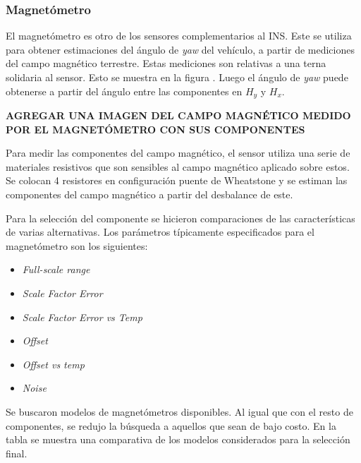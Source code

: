 \subsubsection{Magnetómetro}

El magnetómetro es otro de los sensores complementarios al INS. Este se utiliza para obtener estimaciones del ángulo de \textit{yaw} del vehículo, a partir de mediciones del campo magnético terrestre. Estas mediciones son relativas a una terna solidaria al sensor. Esto se muestra en la figura  . Luego el ángulo de \textit{yaw} puede obtenerse a partir del ángulo entre las componentes en $H_y$ y $H_x$.

\textbf{{\color{red} AGREGAR UNA IMAGEN DEL CAMPO MAGNÉTICO MEDIDO POR EL MAGNETÓMETRO CON SUS COMPONENTES}}

Para medir las componentes del campo magnético, el sensor utiliza una serie de materiales resistivos que son sensibles al campo magnético aplicado sobre estos. Se colocan 4 resistores en configuración puente de Wheatstone y se estiman las componentes del campo magnético a partir del desbalance de este.

Para la selección del componente se hicieron comparaciones de las características de varias alternativas. Los parámetros típicamente especificados para el magnetómetro son los siguientes:

\begin{itemize}
    \item \textit{Full-scale range}
    \item \textit{Scale Factor Error}
    \item \textit{Scale Factor Error vs Temp}
    \item \textit{Offset}
    \item \textit{Offset vs temp}
    \item \textit{Noise}
\end{itemize}

Se buscaron modelos de magnetómetros disponibles. Al igual que con el resto de componentes, se redujo la búsqueda a aquellos que sean de bajo costo. En la tabla  se muestra una comparativa de los modelos considerados para la selección final.

